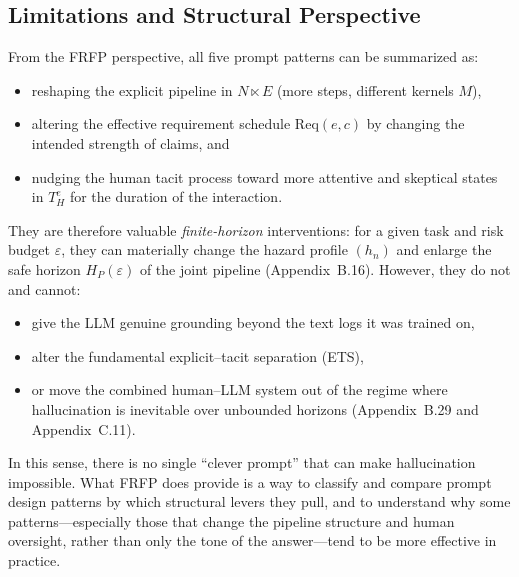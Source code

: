 \subsection{Limitations and Structural Perspective}

From the FRFP perspective, all five prompt patterns can be summarized as:

\begin{itemize}
  \item reshaping the explicit pipeline in $N \ltimes E$ (more steps,
        different kernels $M$),
  \item altering the effective requirement schedule $\mathrm{Req}(e,c)$
        by changing the intended strength of claims, and
  \item nudging the human tacit process toward more attentive and skeptical
        states in $T^e_H$ for the duration of the interaction.
\end{itemize}

They are therefore valuable \emph{finite-horizon} interventions: for a given
task and risk budget $\varepsilon$, they can materially change the hazard
profile $(h_n)$ and enlarge the safe horizon $H_P(\varepsilon)$ of the joint
pipeline (Appendix~B.16). However, they do not and cannot:

\begin{itemize}
  \item give the LLM genuine grounding beyond the text logs it was trained on,
  \item alter the fundamental explicit--tacit separation (ETS),
  \item or move the combined human--LLM system out of the regime where
        hallucination is inevitable over unbounded horizons (Appendix~B.29
        and Appendix~C.11).
\end{itemize}

In this sense, there is no single ``clever prompt'' that can make hallucination
impossible. What FRFP does provide is a way to classify and compare prompt
design patterns by which structural levers they pull, and to understand why
some patterns---especially those that change the pipeline structure and
human oversight, rather than only the tone of the answer---tend to be more
effective in practice.